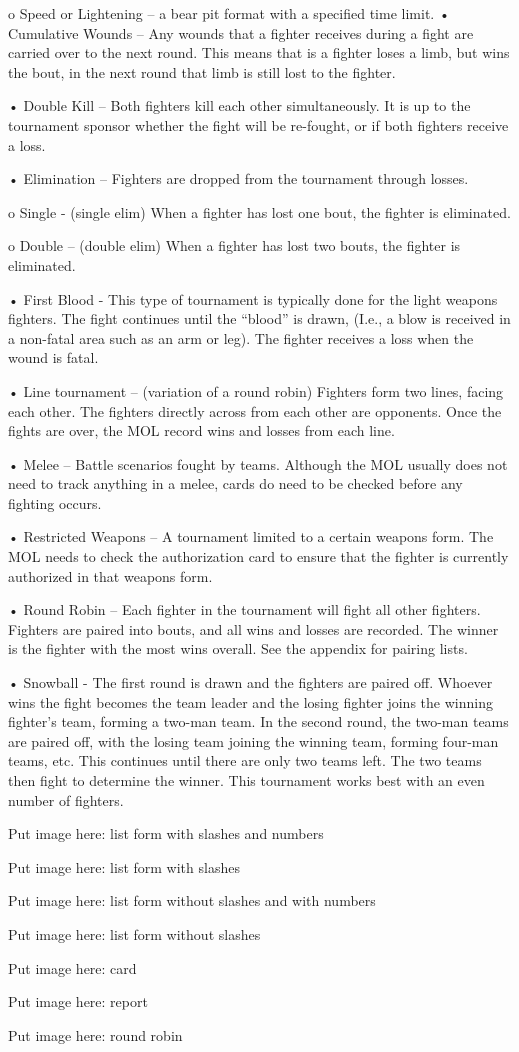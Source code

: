 \documentclass{article}
\begin{document}
o Speed or Lightening – a bear pit format with a specified time limit.
• Cumulative Wounds – Any wounds that a fighter receives during a fight are carried over to the next
round. This means that is a fighter loses a limb, but wins the bout, in the next round that limb is still
lost to the fighter.

• Double Kill – Both fighters kill each other simultaneously. It is up to the tournament sponsor whether
the fight will be re-fought, or if both fighters receive a loss.

• Elimination – Fighters are dropped from the tournament through losses.

o Single - (single elim) When a fighter has lost one bout, the fighter is eliminated.

o Double – (double elim) When a fighter has lost two bouts, the fighter is eliminated.

• First Blood - This type of tournament is typically done for the light weapons fighters. The fight
continues until the “blood” is drawn, (I.e., a blow is received in a non-fatal area such as an arm or leg).
The fighter receives a loss when the wound is fatal.

• Line tournament – (variation of a round robin) Fighters form two lines, facing each other. The
fighters directly across from each other are opponents. Once the fights are over, the MOL record wins
and losses from each line.

• Melee – Battle scenarios fought by teams. Although the MOL usually does not need to track anything
in a melee, cards do need to be checked before any fighting occurs.

• Restricted Weapons – A tournament limited to a certain weapons form. The MOL needs to check the
authorization card to ensure that the fighter is currently authorized in that weapons form.

• Round Robin – Each fighter in the tournament will fight all other fighters. Fighters are paired into
bouts, and all wins and losses are recorded. The winner is the fighter with the most wins overall. See
the appendix for pairing lists.

• Snowball - The first round is drawn and the fighters are paired off. Whoever wins the fight becomes
the team leader and the losing fighter joins the winning fighter’s team, forming a two-man team. In the
second round, the two-man teams are paired off, with the losing team joining the winning team,
forming four-man teams, etc. This continues until there are only two teams left. The two teams then
fight to determine the winner. This tournament works best with an even number of fighters.

Put image here: list form with slashes and numbers

Put image here: list form with slashes


Put image here: list form without slashes and with numbers

Put image here: list form without slashes

Put image here: card

Put image here: report

Put image here: round robin
\end{document}
